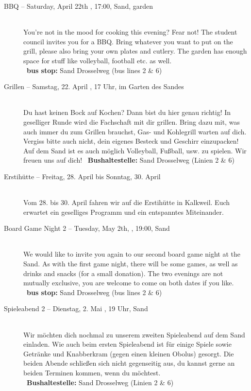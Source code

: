 \begin{description}
\ifml
	\item[BBQ -- Saturday, April 22th \YEAR, 17:00, Sand, garden]~\\
	You're not in the mood for cooking this evening? Fear not!
    The student council invites you for a BBQ. Bring whatever you want to put on the grill,
    please also bring your own plates and cutlery. The garden has enough space for stuff like volleyball, football etc. as well.\\
	~\textbf{bus stop:} Sand Drosselweg (bus lines 2 \& 6)
\else
	\item[Grillen -- Samstag, 22. April \YEAR, 17 Uhr, im Garten des Sandes]~\\
	Du hast keinen Bock auf Kochen? Dann bist du hier genau richtig! In geselliger Runde wird die Fachschaft mit dir grillen.
	Bring dazu mit, was auch immer du zum Grillen brauchst, Gas- und Kohlegrill warten auf dich. Vergiss bitte auch nicht, dein eigenes Besteck und Geschirr einzupacken!\\
	Auf dem Sand ist es auch möglich Volleyball, Fußball, usw. zu spielen. Wir freuen uns auf dich!
	~\textbf{Bushaltestelle:} Sand Drosselweg (Linien 2 \& 6)
\fi

\ifml
\else
	\item[Erstihütte -- Freitag, 28. April bis Sonntag, 30. April \YEAR]~\\
	Vom 28. bis 30. April fahren wir auf die Erstihütte in Kalkweil.
	Euch erwartet ein geselliges Programm und ein entspanntes Miteinander.
\fi

\ifml
	\item[Board Game Night 2 -- Tuesday, May 2th, \YEAR, 19:00, Sand]~\\
	We would like to invite you again to our second board game night at the Sand.
	As with the first game night, there will be some games, as well as drinks and snacks (for a small donation).
	The two evenings are not mutually exclusive, you are welcome to come on both dates if you like.
	~\textbf{bus stop:} Sand Drosselweg (bus lines 2 \& 6)
\else
	\item[Spieleabend 2 -- Dienstag, 2. Mai \YEAR, 19 Uhr, Sand]~\\
	Wir möchten dich nochmal zu unserem zweiten Spieleabend auf dem Sand einladen.
	Wie auch beim ersten Spieleabend ist für einige Spiele sowie Getränke und Knabberkram (gegen einen kleinen Obolus) gesorgt.
	Die beiden Abende schließen sich nicht gegenseitig aus, du kannst gerne an beiden Terminen kommen, wenn du möchtest.\\
	~\textbf{Bushaltestelle:} Sand Drosselweg (Linien 2 \& 6)
\fi


\end{description}
